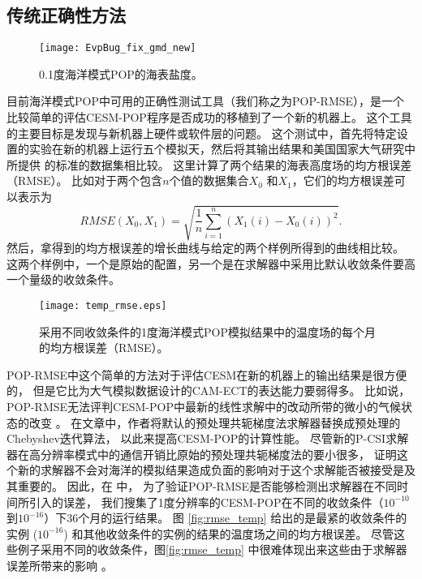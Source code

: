 \subsection{传统正确性方法}
\label{verify:premethod}
\begin{figure}%
\centering
\texttt{[image: EvpBug\_fix\_gmd\_new]}
\caption[] {0.1度海洋模式POP的海表盐度。 \label{fig:sst}}
\end{figure}

目前海洋模式POP中可用的正确性测试工具（我们称之为POP-RMSE），是一个比较简单的评估CESM-POP程序是否成功的移植到了一个新的机器上。 
这个工具的主要目标是发现与新机器上硬件或软件层的问题。 
这个测试中，首先将特定设置的实验在新的机器上运行五个模拟天，然后将其输出结果和美国国家大气研究中所提供 的标准的数据集相比较。
这里计算了两个结果的海表高度场的均方根误差（RMSE）。 比如对于两个包含$n$个值的数据集合$X_0$ 和$X_1$，它们的均方根误差可以表示为
 \begin{equation*}
 RMSE(X_0, X_1) = \sqrt{\frac{1}{n}\sum_{i=1}^n(X_1(i)-X_0(i))^2}.
 \end{equation*}
然后，拿得到的均方根误差的增长曲线与给定的两个样例所得到的曲线相比较。 
这两个样例中，一个是原始的配置，另一个是在求解器中采用比默认收敛条件要高一个量级的收敛条件。 


\begin{figure}%
\begin{center}
\texttt{[image: temp\_rmse.eps]}
\end{center}
\caption[] {采用不同收敛条件的1度海洋模式POP模拟结果中的温度场的每个月的均方根误差（RMSE）。}
\label{fig:ssh_rmse_t}
\end{figure}

POP-RMSE中这个简单的方法对于评估CESM在新的机器上的输出结果是很方便的， 但是它比为大气模拟数据设计的CAM-ECT的表达能力要弱得多。 
比如说，POP-RMSE无法评判CESM-POP中最新的线性求解中的改动所带的微小的气候状态的改变 \cite{yong2015}。 
在文章\cite{yong2015}中，作者将默认的预处理共轭梯度法求解器替换成预处理的Chebyshev迭代算法， 以此来提高CESM-POP的计算性能。
尽管新的P-CSI求解器在高分辨率模式中的通信开销比原始的预处理共轭梯度法的要小很多， 证明这个新的求解器不会对海洋的模拟结果造成负面的影响对于这个求解能否被接受是及其重要的。 
因此，在 \cite{yong2015}中， 为了验证POP-RMSE是否能够检测出求解器在不同时间所引入的误差， 我们搜集了1度分辨率的CESM-POP在不同的收敛条件（$10^{-10}$ 到$10^{-16}$）下36个月的运行结果。  图   \ref{fig:rmse_temp} 给出的是最紧的收敛条件的实例  ($10^{-16}$) 和其他收敛条件的实例的结果的温度场之间的均方根误差。 
尽管这些例子采用不同的收敛条件，图\ref{fig:rmse_temp} 中很难体现出来这些由于求解器误差所带来的影响  \cite{yong2015}。 

